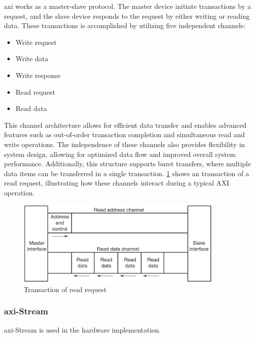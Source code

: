 \acrshort{axi} works as a master-slave protocol. The master device initiate transactions by a request, and the slave device responds to the request by either writing or reading data. These transactions is accomplished by utilizing five independent channels: 
\begin{itemize}
    \item Write request
    \item Write data
    \item Write response
    \item Read request
    \item Read data
\end{itemize}
This channel architecture allows for efficient data transfer and enables advanced features such as out-of-order transaction completion and simultaneous read and write operations. The independence of these channels also provides flexibility in system design, allowing for optimized data flow and improved overall system performance. Additionally, this structure supports burst transfers, where multiple data items can be transferred in a single transaction. \cref{fig:axi_transaction} shows an transaction of a read request, illustrating how these channels interact during a typical AXI operation.

\begin{figure}[h]
    \centering
    \includegraphics[width=0.9\textwidth]{figures/axi_transaction.jpeg}
    \caption{Transaction of read request}
    \label{fig:axi_transaction}
\end{figure}



\subsubsection{\acrshort{axi}-Stream}



\acrshort{axi}-Stream is used in the hardware implementation.


